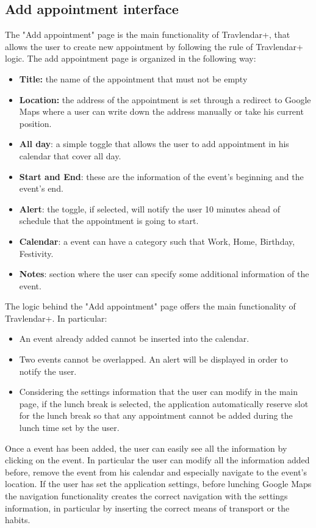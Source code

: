 \subsection*{Add appointment interface}
The "Add appointment" page is the main functionality of Travlendar+, that allows the user to create new appointment by following the rule of Travlendar+ logic. 
The add appointment page is organized in the following way:
\begin{itemize}
\item \textbf{Title:} the name of the appointment that must not be empty
\item \textbf{Location:} the address of the appointment is set through a redirect to Google Maps where a user can write down the address manually or take his current position. 
\item \textbf{All day}: a simple toggle that allows the user to add appointment in his calendar that cover all day.
\item \textbf{Start and End}: these are the information of the event's beginning and the event's end.
\item \textbf{Alert}: the toggle, if selected, will notify the user 10 minutes ahead of schedule that the appointment is going to start.
\item \textbf{Calendar}: a event can have a category such that Work, Home, Birthday, Festivity.
\item \textbf{Notes}: section where the user can specify some additional information of the event.
\end{itemize}

The logic behind the "Add appointment" page offers the main functionality of Travlendar+. In particular:
\begin{itemize}
\item An event already added cannot be inserted into the calendar.
\item Two events cannot be overlapped. An alert will be displayed in order to notify the user.
\item Considering the settings information that the user can modify in the main page, if the lunch break is selected, the application automatically reserve slot for the lunch break so that any appointment cannot be added during the lunch time set by the user.
\end{itemize}

Once a event has been added, the user can easily see all the information by clicking on the event. In particular the user can modify all the information added before, remove the event from his calendar and especially navigate to the event's location. 
If the user has set the application settings, before lunching Google Maps the navigation functionality creates the correct navigation with the settings information, in particular by inserting the correct means of transport or the habits.


